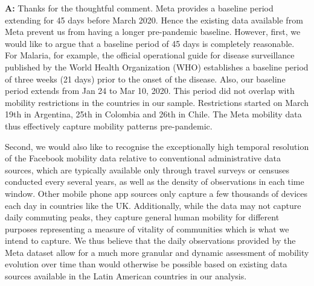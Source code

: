 \documentclass[12pt,a4paper,oneside, reqno]{amsart}
\begin{document}
\setlength{\leftskip}{1cm}\textbf{A:} Thanks for the thoughtful comment. Meta provides a baseline period extending for 45 days before March 2020. Hence the existing data available from Meta prevent us from having a longer pre-pandemic baseline. However, first, we would like to argue that a baseline period of 45 days is completely reasonable. For Malaria, for example, the official operational guide for disease surveillance published by the World Health Organization (WHO) establishes a baseline period of three weeks (21 days) \parencite{WHO2025:UNKNOWNKEY} prior to the onset of the disease. Also, our baseline period extends from Jan 24 to Mar 10, 2020. This period did not overlap with mobility restrictions in the countries in our sample. Restrictions started on March 19th in Argentina, 25th in Colombia and 26th in Chile. The Meta mobility data thus effectively capture mobility patterns pre-pandemic.

Second, we would also like to recognise the exceptionally high temporal resolution of the Facebook mobility data relative to conventional administrative data sources, which are typically available only through travel surveys or censuses conducted every several years, as well as the density of observations in each time window. Other mobile phone app sources only capture a few thousands of devices each day in countries like the UK. Additionally, while the data may not capture daily commuting peaks, they capture general human mobility for different purposes representing a measure of vitality of communities which is what we intend to capture. We thus believe that the daily observations provided by the Meta dataset allow for a much more granular and dynamic assessment of mobility evolution over time than would otherwise be possible based on existing data sources available in the Latin American countries in our analysis.
\end{document}
